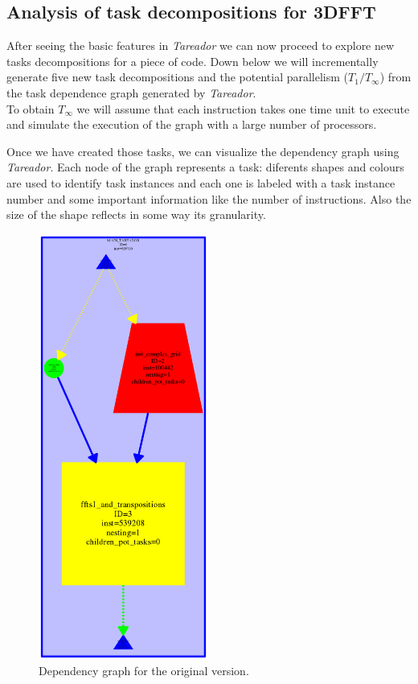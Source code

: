 \documentclass[12]{article}
\begin{document}
\subsection{Analysis of task decompositions for 3DFFT}

After seeing the basic features in \textit{Tareador} we can now proceed to explore new tasks decompositions for a piece of code. Down below we will incrementally generate five new task decompositions and the potential parallelism ($T_1 / T_\infty$) from the task dependence graph generated by \textit{Tareador}. 
\\
To obtain $T_\infty$ we will assume that each instruction takes one time unit to execute and simulate the execution of the graph with a large number of processors.

Once we have created those tasks, we can visualize the dependency graph using \textit{Tareador}. Each node of the graph represents a task: diferents shapes and colours are used to identify task instances and each one is labeled with a task instance number and some important information like the number of instructions. Also the size of the shape reflects in some way its granularity.

\begin{figure}[H]
\centering  \includegraphics[width=.8\linewidth, height=14cm, width=6cm]{images/dependency_graph0.png}
  \caption{Dependency graph for the original version.}
  \label{fig:Depencency0}
\centering
\end{figure}
\end{document}

